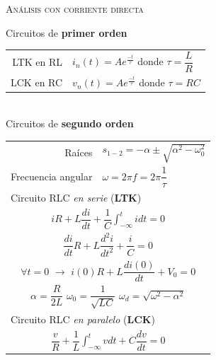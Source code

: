 \documentclass[11pt,a4paper,twocolumn]{article}
\begin{document}
	\begin{tcolorbox}[colback=white!97!brown, colframe=brown!15!gray]
	\begin{center}
		\textsc{Análisis con corriente directa}
	\end{center}
		Circuitos de\textbf{ primer orden}
		
		\begin{tabular}{r l}
			
			LTK en RL & $i_{n}(t)=A e^{\frac{-t}{\tau}}$ donde $\tau=\dfrac{L}{R}$ \\
			LCK en RC & $v_{n}(t)=A e^{\frac{-t}{\tau}}$ donde $\tau=RC$
			
		\end{tabular}\\
	
		Circuitos de\textbf{ segundo orden}
		
		\begin{tabular}{r l}\vspace{.2cm}	
		 	Raíces & $s_{1-2}=-\alpha\pm \sqrt{\alpha^{2}-\omega_{0}^{2}}$\\
	 		Frecuencia angular & $\omega = 2 \pi f = 2 \pi \dfrac{1}{\tau} $\vspace{.2cm}\\ 
	
			\multicolumn{2}{l}{Circuito RLC \textsl{en serie} (\textbf{LTK})} \\
			\multicolumn{2}{c}{$iR+L\dfrac{di}{dt}+\dfrac{1}{C}\displaystyle\int_{-\infty}^{t}idt=0 $} \vspace{.2cm} \\ 
			\multicolumn{2}{c}{$\dfrac{di}{dt}R+L\dfrac{d^2i}{dt^2}+\dfrac{i}{C}=0 $} \vspace{.2cm} \\ 
			\multicolumn{2}{c}{$\forall t=0$ $\rightarrow$ $i(0)R+L\dfrac{di(0)}{dt}+V_{0}=0 $} \vspace{.2cm}\\
			
			 \multicolumn{2}{c}{$\alpha=\dfrac{R}{2L}$ \hspace{.4cm} $\omega_{0}=\dfrac{1}{\sqrt{LC}}$ \hspace{.4cm}  $\omega_{d}=\sqrt{\omega^{2}-\alpha^{2}}$\vspace{.2cm}} \\
			 
			
			\multicolumn{2}{l}{Circuito RLC \textsl{en paralelo} (\textbf{LCK})} \\
			
			\multicolumn{2}{c}{$\dfrac{v}{R}+\dfrac{1}{L}\displaystyle\int_{-\infty}^{t}v dt+C\dfrac{dv}{dt}=0 $} \vspace{.2cm} \\ 
			

\end{tabular}
\end{tcolorbox}
\end{document}
